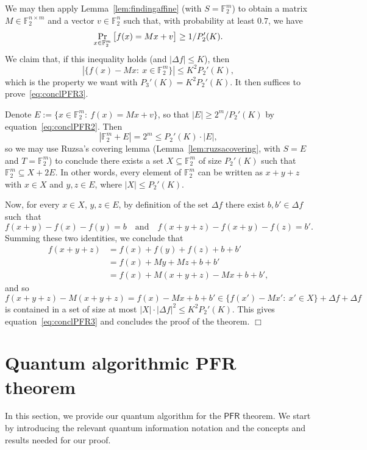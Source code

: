\documentclass[11pt]{amsart}
\renewcommand{\Pr}{\mathop{\mbox{\rm Pr}}}
\newcommand{\F}{\mathbb{F}} %
\newcommand{\PFR}{\textsf{PFR}}
\theoremstyle{plain}
\theoremstyle{definition}
\theoremstyle{remark}
\renewenvironment{proof}[1][]{
    	\begin{trivlist}
     	\item[\hspace{\labelsep}{\em\noindent Proof#1:\/}]}
     	{{\hfill$\Box$}
    	\end{trivlist}
  }
\begin{document}
\begin{proof}
We may then apply Lemma~\ref{lem:findingaffine} (with $S = \F_2^m$) to obtain a matrix $M \in \F_2^{n\times m}$ and a vector $v\in \F_2^n$ such that, with probability at least $0.7$, we have
\begin{equation}
\label{eq:conclPFR2}
    \Pr_{x\in \F_2^m} \big[f(x) = Mx + v\big] \geq 1/P_2'(K).
\end{equation}
We claim that, if this inequality holds (and $|\Delta f| \leq K$), then
\begin{equation}
\label{eq:conclPFR3}
    |\{f(x) - Mx:\: x\in \F_2^m\}| \leq K^2 P_2'(K),
\end{equation}
which is the property we want with $P_3'(K) = K^2 P_2'(K)$.
It then suffices to prove~\eqref{eq:conclPFR3}.

Denote $E := \big\{x\in \F_2^m:\: f(x) = Mx + v\big\}$, so that $|E| \geq 2^m/P_2'(K)$ by  equation~\eqref{eq:conclPFR2}.
Then
$$|\F_2^m + E| = 2^m \leq P_2'(K)\cdot |E|,$$
so we may use Ruzsa's covering lemma (Lemma~\ref{lem:ruzsacovering}, with $S = E$ and $T = \F_2^m$) to conclude there exists a set $X\subseteq \F_2^m$ of size $P_2'(K)$ such that $\F_2^m \subseteq X + 2E$.
In other words, every element of $\F_2^m$ can be written as $x+y+z$ with $x\in X$ and $y, z\in E$, where $|X| \leq P_2'(K)$.

Now, for every $x\in X$, $y, z\in E$, by definition of the set $\Delta f$ there exist $b, b'\in \Delta f$ such~that
$$f(x+y)-f(x)-f(y) = b \quad \text{and} \quad f(x+y+z)-f(x+y)-f(z) = b'.$$
Summing these two identities, we conclude that
\begin{align*}
    f(x+y+z)
    &= f(x) + f(y) + f(z) + b+b' \\
    &= f(x) + My + Mz + b+b' \\
    &= f(x) + M(x+y+z) - Mx + b+b',
\end{align*}
and so
$$f(x+y+z) - M(x+y+z) = f(x) - Mx + b+b' \in \big\{f(x') - Mx':\: x'\in X\big\} + \Delta f+\Delta f$$
is contained in a set of size at most $|X|\cdot |\Delta f|^2 \leq K^2 P_2'(K)$.
This gives  equation~\eqref{eq:conclPFR3} and concludes the proof of the theorem.
\end{proof}




\section{Quantum algorithmic PFR theorem}
\label{sec:quantum}

In this section, we provide our quantum algorithm for the $\PFR$ theorem.
We start by introducing the relevant quantum information notation and the concepts and results needed for our proof.
\end{document}
